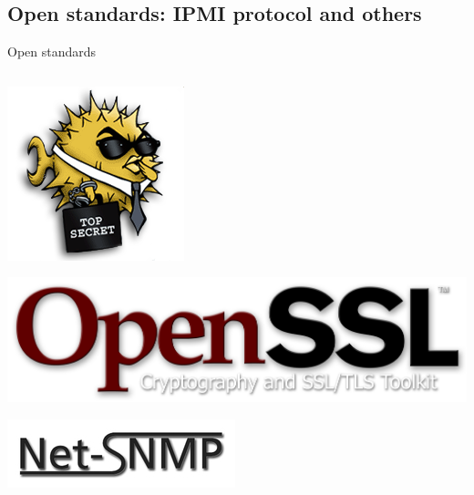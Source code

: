 \documentclass{beamer}
\begin{document}
  \subsection{ Open standards: IPMI protocol and others}
	\begin{frame}{Open standards}

		\begin{columns}[onlytextwidth]
			\begin{column}{0.2\textwidth}
				\includegraphics[width=\textwidth]{logo/openssh.png}

				\includegraphics[width=\textwidth]{logo/openssl.png}

				\includegraphics[width=\textwidth]{logo/netsnmp.jpg}
				

\end{column}
\end{columns}
\end{frame}
\end{document}
